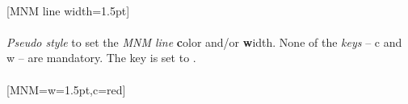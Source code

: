 \\ [5pt][MNM line width=1.5pt]%
\\ [10pt]\makebox[\linewidth][c]{\scalebox{.6}{\pgfPT[MNM line width=1.5pt]}}%
\\ [0pt]\pgfPTendoption%
\label{style_MNM}%
%
{\textit{Pseudo style} to set the \textit{MNM line} \textbf{c}olor and/or \textbf{w}idth. None of the \textit{keys} -- c and w -- are mandatory. The key  is set to .
\\ [3pt]%
}%
\\ [5pt][MNM={w=1.5pt,c=red}]%
\\ [10pt]\makebox[\linewidth][c]{\scalebox{.6}{\pgfPT[MNM={w=1.5pt,c=red}]}}%
\\ [0pt]\pgfPTendstyle%
\endinput%
